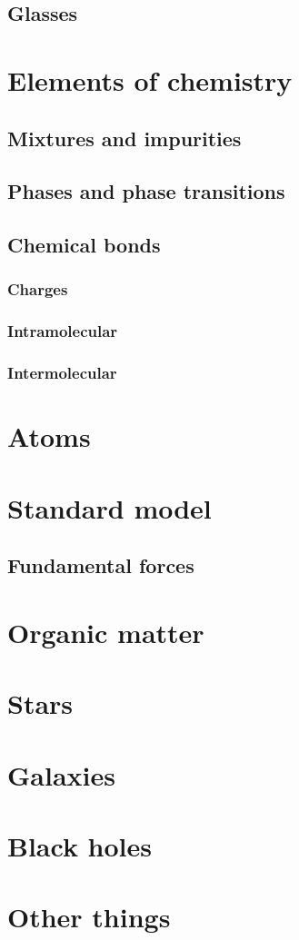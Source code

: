 \section{Glasses}

\chapter{Elements of chemistry}

\section{Mixtures and impurities}
\section{Phases and phase transitions}
\section{Chemical bonds}
\subsection{Charges}
\subsection{Intramolecular}
\subsection{Intermolecular}

\chapter{Atoms}

\chapter{Standard model}

\section{Fundamental forces}

\chapter{Organic matter}

\chapter{Stars}

\chapter{Galaxies}

\chapter{Black holes}

\chapter{Other things}

